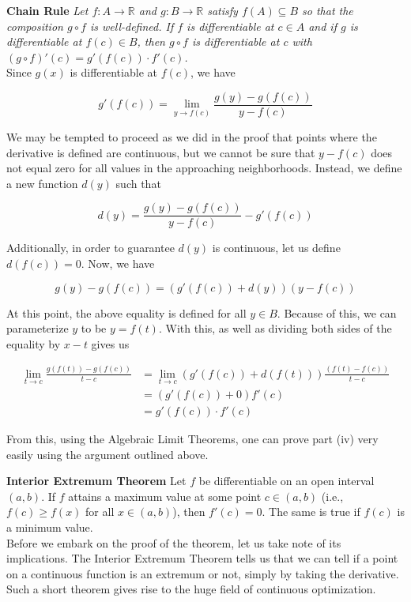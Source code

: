 \documentclass[12pt, letterpaper, twoside]{article}
\begin{document}
\textbf{Chain Rule} \textit{ Let $f : A \to \mathbb{R}$ and $g : B \to \mathbb{R}$ satisfy $f(A) \subseteq
B$ so that the composition $g \circ f$ is well-defined. If $f$ is differentiable at $c \in A$
and if $g$ is differentiable at $f(c) \in B$, then $g \circ f$ is differentiable at $c$ with $(g \circ f)'(c) = g'(f(c)) \cdot f'(c)$.} \\

Since $g(x)$ is differentiable at $f(c)$, we have 

$$
g'(f(c)) = \lim_{y \to f(c)} \frac{g(y) - g(f(c))}{y - f(c)}
$$

We may be tempted to proceed as we did in the proof that points where the derivative is defined are continuous, but we cannot be sure that $y - f(c)$ does not equal zero for all values in the approaching neighborhoods. Instead, we define a new function $d(y)$ such that 

$$
    d(y) = \frac{g(y) - g(f(c))}{y - f(c)} - g'(f(c))
$$

Additionally, in order to guarantee $d(y)$ is continuous, let us define $d(f(c)) = 0$. Now, we have 

$$
    g(y) - g(f(c)) = (g'(f(c)) + d(y))(y - f(c))
$$

At this point, the above equality is defined for all $y \in B$. Because of this, we can parameterize $y$ to be $y = f(t)$. With this, as well as dividing both sides of the equality by $x-t$ gives us

\begin{align*}
    \lim_{t \to c} \frac{g(f(t)) - g(f(c))}{t-c} &= \lim_{t \to c} (g'(f(c)) + d(f(t)))\frac{(f(t) - f(c))}{t-c} \\
    &= (g'(f(c)) + 0) f'(c) \\ 
    &= g'(f(c)) \cdot f'(c)
\end{align*}

From this, using the Algebraic Limit Theorems, one can prove part (iv) very easily using the argument outlined above. \newpage

\textbf{Interior Extremum Theorem} Let $f$ be differentiable on
an open interval $(a, b)$. If $f$ attains a maximum value at some point $c \in (a, b)$
(i.e., $f(c) \geq f(x)$ for all $x \in (a, b)$), then $f'(c) = 0$. The same is true if $f(c)$ is
a minimum value. \\

Before we embark on the proof of the theorem, let us take note of its implications. The Interior Extremum Theorem tells us that we can tell if a point on a continuous function is an extremum or not, simply by taking the derivative. Such a short theorem gives rise to the huge field of continuous optimization. \\
\end{document}
